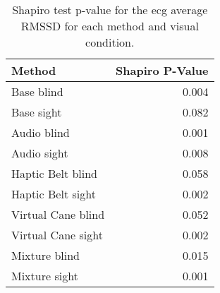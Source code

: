 
\begin{table}[!htb]
\centering
\caption{Shapiro test p-value for the ecg average RMSSD for each method and visual condition.}
\label{tab:shapiro_ecg_rmssd}
\begin{tabular}{lr}
\toprule
            Method &  Shapiro P-Value \\
\midrule
        Base blind &            0.004 \\
        Base sight &            0.082 \\
       Audio blind &            0.001 \\
       Audio sight &            0.008 \\
 Haptic Belt blind &            0.058 \\
 Haptic Belt sight &            0.002 \\
Virtual Cane blind &            0.052 \\
Virtual Cane sight &            0.002 \\
     Mixture blind &            0.015 \\
     Mixture sight &            0.001 \\
\bottomrule
\end{tabular}
\end{table}

